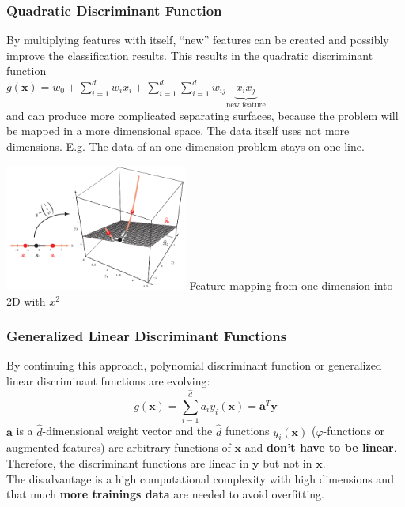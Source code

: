   
  \label{sec:generalized_linear_discriminant_function}
  \begin{minipage}{12cm}
    \subsubsection{Quadratic Discriminant Function}
    By multiplying features with itself, ``new'' features can be created and possibly improve the classification
    results. This results in the quadratic discriminant function\\
    $g(\bm x) = w_0 + \sum\limits_{i=1}^d w_i x_i + \sum\limits_{i=1}^d \sum\limits_{i=1}^d w_{ij} \underbrace{x_i x_j}_{\text{new feature}}$\\
    and can produce more complicated separating surfaces, because the problem will be mapped in a more dimensional space.
    The data itself uses not more dimensions. E.g. The data of an one dimension problem stays on one line.
  \end{minipage}
  \hspace{5mm}
  \begin{minipage}{6cm}
    	 \includegraphics[width=6cm]{./images/map1DTo2D.png}
    	 Feature mapping from one dimension into 2D with $x^2$
  \end{minipage}
  
    \subsubsection{Generalized Linear Discriminant Functions}
    By continuing this approach, polynomial discriminant function or generalized linear discriminant 
    functions are evolving: 
    $$g(\bm x) = \sum\limits_{i=1}^{\hat d} a_i y_i(\bm x) = \bm a^T \bm y$$
    $\bm a$ is a 
    $\hat d$-dimensional weight vector and the $\hat d$ functions $y_i(\bm x)$ ($\varphi$-functions 
    or augmented features) are arbitrary functions of $\bm x$ and \textbf{don't have to be linear}.
    Therefore, the discriminant functions are linear in $\bm y$ but not in $\bm x$.\\
    The disadvantage is a high computational complexity with high dimensions and that much 
    \textbf{more trainings data} are needed to avoid overfitting.
     
